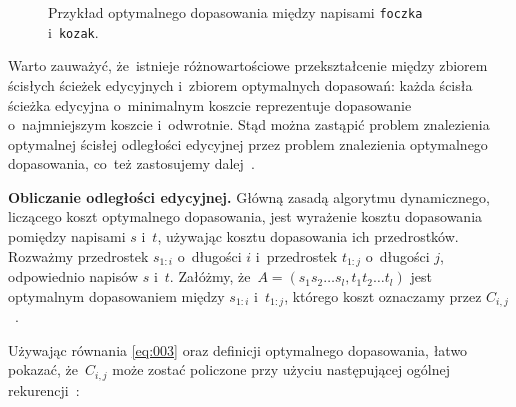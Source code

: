 \documentclass{praca1}
\begin{document}
\begin{figure}[width=80pt]
\centering
{}
\cprotect\caption{Przykład optymalnego dopasowania między napisami \verb|foczka| i~\verb|kozak|.}\label{rys:001}
\end{figure}

Warto zauważyć, że~istnieje różnowartościowe przekształcenie między zbiorem ścisłych ścieżek edycyjnych i~zbiorem optymalnych dopasowań: każda ścisła ścieżka edycyjna o~minimalnym koszcie reprezentuje dopasowanie o~najmniejszym koszcie i~odwrotnie. Stąd można zastąpić problem znalezienia optymalnej ścisłej odległości edycyjnej przez problem znalezienia optymalnego dopasowania, co~też zastosujemy dalej~\cite{Boytsov2011:indexingmethods}.

\textbf{Obliczanie odległości edycyjnej.} Główną zasadą algorytmu dynamicznego, liczącego koszt optymalnego dopasowania, jest wyrażenie kosztu dopasowania pomiędzy napisami $s$ i~$t$, używając kosztu dopasowania ich przedrostków. Rozważmy przedrostek $s_{1:i}$ o~długości $i$ i~przedrostek $t_{1:j}$ o~długości $j$, odpowiednio napisów $s$ i~$t$. Załóżmy, że~$A = (s_1 s_2\ldots s_l, t_1 t_2 \ldots t_l)$ jest optymalnym dopasowaniem między $s_{1:i}$ i~$t_{1:j}$, którego koszt oznaczamy przez $C_{i,j}$~\cite{Boytsov2011:indexingmethods}.

Używając równania \eqref{eq:003} oraz definicji optymalnego dopasowania, łatwo pokazać, że~$C_{i,j}$ może zostać policzone przy użyciu następującej ogólnej rekurencji~\cite{Ukkonen1985:algorithmsforapprox}:
\end{document}
